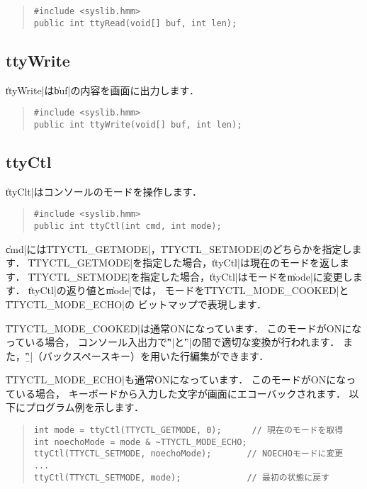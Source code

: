 \begin{quote}
\begin{verbatim}
#include <syslib.hmm>
public int ttyRead(void[] buf, int len);
\end{verbatim}
\end{quote}

\subsection{ttyWrite}

\|ttyWrite|は\|buf|の内容を画面に出力します．

\begin{quote}
\begin{verbatim}
#include <syslib.hmm>
public int ttyWrite(void[] buf, int len);
\end{verbatim}
\end{quote}

\subsection{ttyCtl}

\|ttyClt|はコンソールのモードを操作します．

\begin{quote}
\begin{verbatim}
#include <syslib.hmm>
public int ttyCtl(int cmd, int mode);
\end{verbatim}
\end{quote}

\|cmd|には\|TTYCTL_GETMODE|，\|TTYCTL_SETMODE|のどちらかを指定します．
\|TTYCTL_GETMODE|を指定した場合，\|ttyCtl|は現在のモードを返します．
\|TTYCTL_SETMODE|を指定した場合，\|ttyCtl|はモードを\|mode|に変更します．
\|ttyCtl|の返り値と\|mode|では，
モードを\|TTYCTL_MODE_COOKED|と\|TTYCTL_MODE_ECHO|の
ビットマップで表現します．

\|TTYCTL_MODE_COOKED|は通常ONになっています．
このモードがONになっている場合，
コンソール入出力で\|'\r'|と\|'\n'|の間で適切な変換が行われます．
また，\|'\b'|（バックスペースキー）を用いた行編集ができます．

\|TTYCTL_MODE_ECHO|も通常ONになっています．
このモードがONになっている場合，
キーボードから入力した文字が画面にエコーバックされます．
以下にプログラム例を示します．

\begin{quote}
\begin{verbatim}
int mode = ttyCtl(TTYCTL_GETMODE, 0);      // 現在のモードを取得
int noechoMode = mode & ~TTYCTL_MODE_ECHO;
ttyCtl(TTYCTL_SETMODE, noechoMode);       // NOECHOモードに変更
...
ttyCtl(TTYCTL_SETMODE, mode);             // 最初の状態に戻す
\end{verbatim}
\end{quote}
